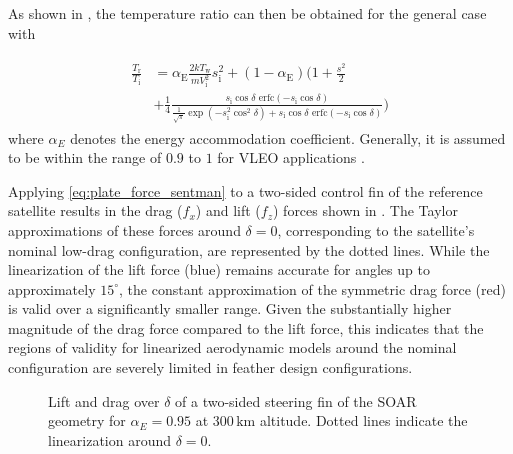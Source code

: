\documentclass[pdflatex,sn-mathphys-num]{sn-jnl}%
\theoremstyle{thmstyleone}%
\theoremstyle{thmstyletwo}%
\theoremstyle{thmstylethree}%
\begin{document}
		As shown in \cite{tuttasGeneralizedTreatmentEnergy2025a}, the temperature ratio can then be obtained for the general case with

		\begin{align}
			\begin{split}
				\frac{T_\mathrm{r}}{T_\mathrm{i}} &= \alpha_\mathrm{E} \frac{2 k T_\mathrm{w}}{m V_\mathrm{i}^2} s_{\text{i}}^2
                + \left( 1 - \alpha_\mathrm{E} \right) 
                \bigg(
					1 + \frac{s^2}{2} \\ & 
                    + \frac{1}{4} \frac{ s_{\text{i}} \cos\delta \text{ erfc}\left( - s_{\text{i}} \cos\delta \right) }{\frac{1}{\sqrt{\pi}} \exp \left( - s_{\text{i}}^2 \cos^2\delta \right) + s_{\text{i}} \cos\delta \text{ erfc}\left( - s_{\text{i}} \cos\delta \right)}
				\bigg)
			\end{split}
		\end{align}
		where $\alpha_E$ denotes the energy accommodation coefficient. Generally, it is assumed to be within the range of $0.9$ to $1$ for VLEO applications \cite{moe_gassurface_2005}.

		Applying \cref{eq:plate_force_sentman} to a two-sided control fin of the reference satellite results in the drag ($f_x$) and lift ($f_z$) forces shown in . The Taylor approximations of these forces around $\delta = 0$, corresponding to the satellite's nominal low-drag configuration, are represented by the dotted lines.
		While the linearization of the lift force (blue) remains accurate for angles up to approximately $15^\circ$, the constant approximation of the symmetric drag force (red) is valid over a significantly smaller range. Given the substantially higher magnitude of the drag force compared to the lift force, this indicates that the regions of validity for linearized aerodynamic models around the nominal configuration are severely limited in feather design configurations.


		\begin{figure}[t]
			\centering
			
			\caption{Lift and drag over $\delta$ of a two-sided steering fin of the SOAR geometry for $\alpha_E=0.95$ at $300\,\text{km}$ altitude. Dotted lines indicate the linearization around $\delta=0$.}
			\label{fig:linearization}
		\end{figure}
		
\end{document}
